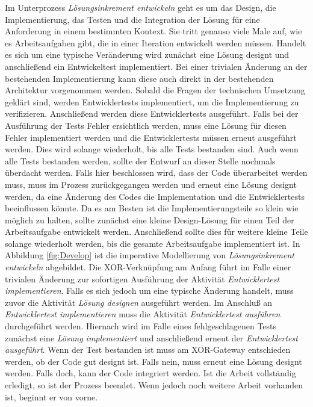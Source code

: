Im Unterprozess \textit{Lösungsinkrement entwickeln} geht es um das Design, die Implementierung, das Testen und die Integration der Lösung für eine Anforderung in einem bestimmten Kontext. Sie tritt genauso viele Male auf, wie es Arbeitsaufgaben gibt, die in einer Iteration entwickelt werden müssen.
 Handelt es sich um eine typische Veränderung wird zunächst eine Lösung designt und anschließend ein Entwickeltest implementiert. Bei einer trivialen Änderung an der bestehenden Implementierung kann diese auch direkt in der bestehenden Architektur vorgenommen werden. \newline
 Sobald die Fragen der technischen Umsetzung geklärt sind, werden Entwicklertests implementiert, um die Implementierung zu verifizieren. Anschließend werden diese Entwicklertests ausgeführt.\newline
 Falls bei der Ausführung der Tests Fehler ersichtlich werden, muss eine Lösung für diesen Fehler implementiert werden und die Entwicklertests müssen erneut ausgeführt werden. Dies wird solange wiederholt, bis alle Tests bestanden sind.\newline
 Auch wenn alle Tests bestanden werden, sollte der Entwurf an dieser Stelle nochmals überdacht werden. Falls hier beschlossen wird, dass der Code überarbeitet werden muss, muss im Prozess zurückgegangen werden und erneut eine Lösung designt werden, da eine Änderung des Codes die Implementation und die Entwicklertests beeinflussen könnte.\newline
 Da es am Besten ist die Implementierungsteile so klein wie möglich zu halten, sollte zunächst eine kleine Design-Lösung für einen Teil der Arbeitsaufgabe entwickelt werden. Anschließend sollte dies für weitere kleine Teile solange wiederholt werden, bis die gesamte Arbeitsaufgabe implementiert ist. \newline
 In Abbildung \ref{fig:Develop} ist die imperative Modellierung von \textit{Lösungsinkrement entwickeln} abgebildet.\newline
 Die XOR-Verknüpfung am Anfang führt im Falle einer trivialen Änderung zur sofortigen Ausführung der Aktivität \textit{Entwicklertest implementieren}. Falls es sich jedoch um eine typische Änderung handelt, muss zuvor die Aktivität \textit{Lösung designen} ausgeführt werden. Im Anschluß an \textit{Entwicklertest implementieren} muss die Aktivität \textit{Entwicklertest ausführen} durchgeführt werden.\newline
 Hiernach wird im Falle eines fehlgeschlagenen Tests zunächst eine \textit{Lösung implementiert} und anschließend erneut der \textit{Entwicklertest ausgeführt}. \newline
 Wenn der Test bestanden ist muss am XOR-Gateway entschieden werden, ob der Code gut designt ist. Falls nein, muss erneut eine Lösung designt werden. Falls doch, kann der Code integriert werden. Ist die Arbeit vollständig erledigt, so ist der Prozess beendet. Wenn jedoch noch weitere Arbeit vorhanden ist, beginnt er von vorne.
 
